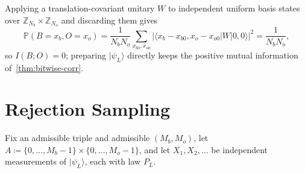\documentclass[11pt,a4paper]{article}
\theoremstyle{plain}
\theoremstyle{definition}
\theoremstyle{remark}
\newcommand{\Z}{\mathbb{Z}}
\newcommand{\Prob}{\mathbb{P}}
\newcommand{\ket}[1]{\lvert#1\rangle}
\newcommand{\bra}[1]{\langle#1\rvert}
\begin{document}
\begin{remark}\label{rem:washout}
  Applying a translation-covariant unitary \( W \) to independent uniform basis states over
  \( \Z_{N_b} \times \Z_{N_o} \) and discarding them gives
  \[
    \Prob(B = x_b, O = x_o) = \frac{1}{N_b N_o}\sum_{x_{b0}, x_{o0}}
    {\lvert \bra{x_b - x_{b0}, x_o - x_{o0}} W \ket{0, 0} \rvert}^2 = \frac{1}{N_b N_o},
  \]
  so \( I(B; O) = 0 \); preparing \( \ket{\psi_L} \) directly keeps the
  positive mutual information of~\cref{thm:bitwise-corr}.
\end{remark}

\clearpage
\section{Rejection Sampling}\label{sec:rejection}

Fix an admissible triple and admissible \( (M_b, M_o) \), let
\( A \coloneqq \{0, \dots, M_b - 1\} \times \{0, \dots, M_o - 1\} \), and let
\( X_1, X_2, \dots \) be independent measurements of \( \ket{\psi_L} \), each with law \( P_L \).
\end{document}
